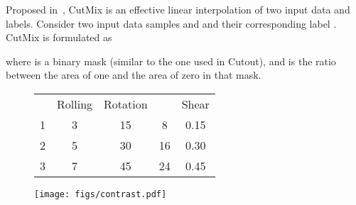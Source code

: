 \documentclass[runningheads]{llncs}
\newcommand{\bftab}{\fontseries{b}\selectfont}
\begin{document}
\noindent{\bftab CutMix.} Proposed in~\cite{yun2019cutmix}, CutMix is an effective linear interpolation of two input data and labels. Consider two input data samples  and  and their corresponding label . CutMix is formulated as

where  is a binary mask (similar to the one used in Cutout), and  is the ratio between the area of one and the area of zero in that mask.  





\begin{figure}[t]
\noindent\begin{minipage}{\textwidth}
\begin{minipage}{0.68\textwidth}
\centering
{}
\begin{tabular}{l  c  c  c  c}
    \toprule
{\bftab} & {\bftab Rolling}  & {\bftab Rotation}  & \bftab{Cutout}  & {\bftab Shear}  \\
\noalign{\smallskip}
\hline
\noalign{\smallskip}
1 & 3 & 15 & 8 & 0.15 \\
2 & 5 & 30 & 16 & 0.30 \\
3 & 7 & 45 & 24 & 0.45 \\
\bottomrule
\end{tabular}
\label{tab_nda_N}
\end{minipage}
\hfill
\begin{minipage}{0.31\textwidth}
\centering
\texttt{[image: figs/contrast.pdf]}
\label{fig_contrast_learning}
\end{minipage}
\end{minipage}
\end{figure}
\end{document}
